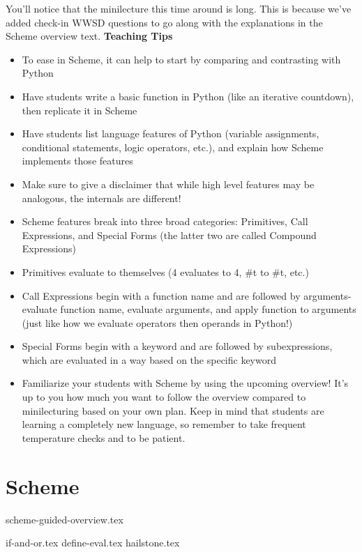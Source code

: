 \documentclass{exam}
\begin{document}
\begin{meta}
    You'll notice that the minilecture this time around is long. This is because we've added check-in WWSD questions to go along with the explanations in the Scheme overview text.
\textbf{Teaching Tips}
\begin{itemize}
    \item To ease in Scheme, it can help to start by comparing and contrasting with Python
    \item Have students write a basic function in Python (like an iterative countdown), then replicate it in Scheme
    \item Have students list language features of Python (variable assignments, conditional statements, logic operators, etc.), and explain how Scheme implements those features
    \item Make sure to give a disclaimer that while high level features may be analogous, the internals are different!
    \item Scheme features break into three broad categories: Primitives, Call Expressions, and Special Forms (the latter two are called Compound Expressions)
    \item Primitives evaluate to themselves (4 evaluates to 4, \#t to \#t, etc.)
    \item Call Expressions begin with a function name and are followed by arguments- evaluate function name, evaluate arguments, and apply function to arguments (just like how we evaluate operators then operands in Python!)
    \item Special Forms begin with a keyword and are followed by subexpressions, which are evaluated in a way based on the specific keyword
    \item Familiarize your students with Scheme by using the upcoming overview! It's up to you how much you want to follow the overview compared to minilecturing based on your own plan. Keep in mind that students are learning a completely new language, so remember to take frequent temperature checks and to be patient.
\end{itemize}
\end{meta}

\section{Scheme}
{scheme-guided-overview.tex}
\begin{questions}
{if-and-or.tex}
{define-eval.tex}
{hailstone.tex}
\end{questions}
\end{document}
